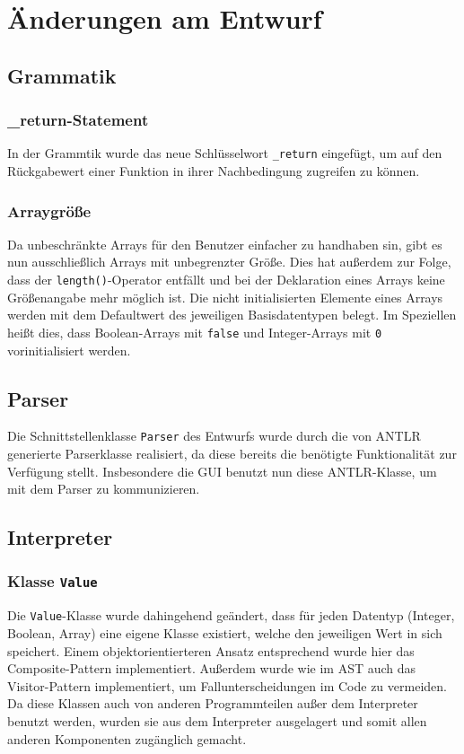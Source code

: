 \section{Änderungen am Entwurf}
\subsection{Grammatik}
\subsubsection{\_return-Statement}
In der Grammtik wurde das neue Schlüsselwort \texttt{\_return} eingefügt, um auf den Rückgabewert einer Funktion in ihrer Nachbedingung zugreifen zu können.
\subsubsection{Arraygröße}
Da unbeschränkte Arrays für den Benutzer einfacher zu handhaben sin, gibt es nun ausschließlich Arrays mit unbegrenzter Größe. Dies hat außerdem zur Folge, dass der \texttt{length()}-Operator entfällt und bei der Deklaration eines Arrays keine Größenangabe mehr möglich ist. Die nicht initialisierten Elemente eines Arrays werden mit dem Defaultwert des jeweiligen Basisdatentypen belegt. Im Speziellen heißt dies, dass Boolean-Arrays mit \texttt{false} und Integer-Arrays mit \texttt{0} vorinitialisiert werden.

\subsection{Parser\label{aenderung_parser}}
Die Schnittstellenklasse \texttt{Parser} des Entwurfs wurde durch die von ANTLR generierte Parserklasse realisiert, da diese bereits die benötigte Funktionalität zur Verfügung stellt. Insbesondere die GUI benutzt nun diese ANTLR-Klasse, um mit dem Parser zu kommunizieren.

\subsection{Interpreter}
\subsubsection{Klasse \texttt{Value}}
Die \texttt{Value}-Klasse wurde dahingehend geändert, dass für jeden Datentyp (Integer, Boolean, Array) eine eigene Klasse existiert, welche den jeweiligen Wert in sich speichert. Einem objektorientierteren Ansatz entsprechend wurde hier das Composite-Pattern implementiert. Außerdem wurde wie im AST auch das Visitor-Pattern implementiert, um Fallunterscheidungen im Code zu vermeiden. Da diese Klassen auch von anderen Programmteilen außer dem Interpreter benutzt werden, wurden sie aus dem Interpreter ausgelagert und somit allen anderen Komponenten zugänglich gemacht.

